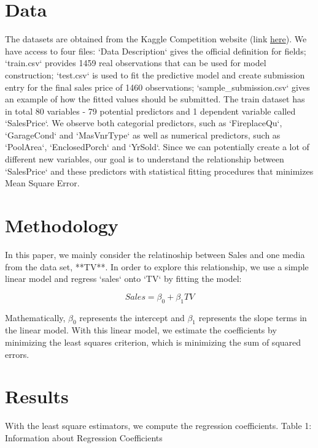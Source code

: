 \documentclass[a4paper]{article}
\begin{document}
\section{Data}
The datasets are obtained from the Kaggle Competition website (link \href{https://www.kaggle.com/c/house-prices-advanced-regression-techniques/data}{here}). We have access to four files: `Data Description` gives the official definition for fields; `train.csv` provides 1459 real observations that can be used for model construction; `test.csv` is used to fit the predictive model and create submission entry for the final sales price of 1460 observations; `sample_submission.csv` gives an example of how the fitted values should be submitted.
\newline
\newline
The train dataset has in total 80 variables - 79 potential predictors and 1 dependent variable called `SalesPrice`. We observe both categorial predictors, such as `FireplaceQu`, `GarageCond` and `MasVnrType` as well as numerical predictors, such as `PoolArea`, `EnclosedPorch` and `YrSold`. Since we can potentially create a lot of different new variables, our goal is to understand the relationship between `SalesPrice` and these predictors with statistical fitting procedures that minimizes Mean Square Error.

\section{Methodology}
In this paper, we mainly consider the relatinoship between Sales and one media from the data set, **TV**. In order to explore this relationship, we use a simple linear model and regress `sales` onto `TV` by fitting the model:

\begin{equation}
Sales = \beta_0 + \beta_1 TV
\end{equation}

Mathematically, $\beta_0$ represents the intercept and $\beta_1$ represents the slope terms in the linear model. With this linear model, we estimate the coefficients by minimizing the least squares criterion, which is minimizing the sum of squared errors.

\section{Results}

With the least square estimators, we compute the regression coefficients.\newline
Table 1: Information about Regression Coefficients
\end{document}
